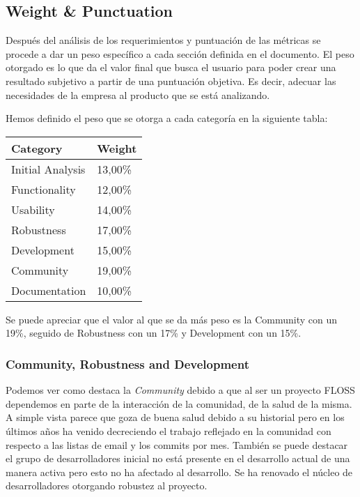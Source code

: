 \documentclass[11pt]{scrartcl}
\begin{document}
\subsection{Weight \& Punctuation}

Despu\'es del an\'alisis de los requerimientos y puntuaci\'on de las m\'etricas se procede a dar un peso espec\'ifico a cada secci\'on definida en el documento. El peso otorgado es lo que da el valor final que busca el usuario para poder crear una resultado subjetivo a partir de una puntuaci\'on objetiva. Es decir, adecuar las necesidades de la empresa al producto que se est\'a analizando.

Hemos definido el peso que se otorga a cada categor\'ia en la siguiente tabla:

    \begin{tabular}{|l|l|}
        \hline Category & Weight\\
        \hline Initial Analysis	 & 13,00\%\\
        \hline Functionality & 12,00\%\\
        \hline Usability & 14,00\%\\
        \hline Robustness & 17,00\%\\
        \hline Development & 15,00\%\\
        \hline Community & 19,00\%\\
        \hline Documentation & 10,00\%\\
        \hline
    \end{tabular}

\par Se puede apreciar que el valor al que se da m\'as peso es la Community con un 19\%, seguido de Robustness con un 17\% y Development con un 15\%. 

\subsubsection{Community, Robustness and Development}

\par Podemos ver como destaca la \emph{Community} debido a que al ser un proyecto FLOSS dependemos en parte de la interacci\'on de la comunidad, de la salud de la misma. A simple vista parece que goza de buena salud debido a su historial pero en los \'ultimos a\~nos ha venido decreciendo el trabajo reflejado en la comunidad con respecto a las listas de email y los commits por mes. Tambi\'en se puede destacar el grupo de desarrolladores inicial no est\'a presente en el desarrollo actual de una manera activa pero esto no ha afectado al desarrollo. Se ha renovado el n\'ucleo de desarrolladores otorgando robustez al proyecto.
\end{document}
